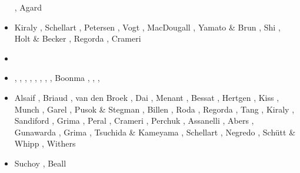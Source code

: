 \begin{scriptsize}
\begin{itemize}
                           \cite{jada16b}\cite{liku16}
                           \cite{chss16}, Agard \etal \cite{agys16}
\item[\twothousandseventeen] Kiraly \etal \cite{kicf17}, Schellart \cite{sche17}, 
                             Petersen \etal \cite{pest17}, Vogt \etal \cite{vomc17}, 
                             MacDougall \etal \cite{majf17}, Yamato \& Brun \cite{yabr17}, 
                             Shi \etal \cite{shwl17}, Holt \& Becker \cite{hobe17}, 
                             Regorda \etal \cite{rerm17}, Crameri \etal \cite{crlt17}
\item[\twothousandeighteen] \cite{yamz18}\cite{crli18}
                            \cite{spcv18}\cite{chss18}
                            \cite{yagz18}\cite{mazh18}
                            \cite{pukp18}\cite{masg18}
                            \cite{biar18}
\item[\twothousandnineteen] \cite{magn19}, \cite{mavb19},
                            \cite{scvm19}, \cite{cakc19},
                            \cite{samo19}, \cite{sihf19},
                            \cite{meag19}, \cite{vaws19}, 
                            Boonma \etal \cite{bokg19}, \cite{vawg19},
                            \cite{cibi19}, \cite{pust19}
\item[\twothousandtwenty] Alsaif \etal \cite{algg20}, Briaud \etal \cite{braf20},
                          van den Broek \etal \cite{vamg20}, Dai \etal \cite{dawl20},
                          Menant \etal \cite{meag20}, Bessat \etal \cite{bedh20},
                          Hertgen \etal \cite{heyg20}, Kiss \etal \cite{kicd20},
                          Munch \etal \cite{mugu20}, Garel \etal \cite{gatt20},
                          Pusok \& Stegman \cite{pust20}, Billen \cite{bill20},
                          Roda \etal \cite{rozr20}, Regorda \etal \cite{relr20}, 
                          Tang \etal \cite{tacm20}, Kiraly \etal \cite{kiph20}, 
                          Sandiford \etal \cite{sams20}, Grima \etal \cite{grlc20}, 
                          Peral \etal \cite{perz20}, Crameri \etal \cite{crmd20}, 
                          Perchuk \etal \cite{pegz20}, Assanelli \etal \cite{aslr20}, 
                          Abers \etal \cite{abvw20}, Gunawarda \etal \cite{gumc20},
                          Grima \etal \cite{grlc20}, Tsuchida \& Kameyama \cite{tska20},
                          Schellart \cite{sche20}, Negredo \etal \cite{nemc20},
                          Sch{\"u}tt \& Whipp \cite{scwh20}, Withers \cite{with20}
\item[\twothousandtwentyone] Suchoy \etal \cite{sugm21}, Beall \etal \cite{befd21}
\end{itemize}
\end{scriptsize}

